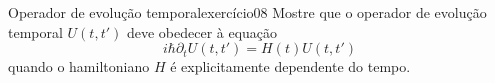 \begin{exercício}{Operador de evolução temporal}{exercício08}
    Mostre que o operador de evolução temporal \(U(t, t')\) deve obedecer à equação
    \begin{equation*}
        i \hbar \partial_t U(t, t') = H(t) U(t, t')
    \end{equation*}
    quando o hamiltoniano \(H\) é explicitamente dependente do tempo.
\end{exercício}
